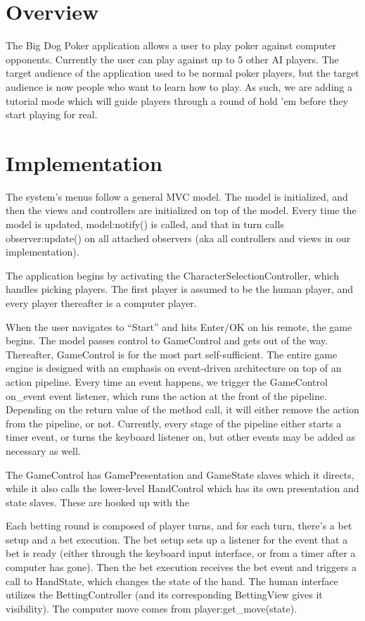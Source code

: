 \documentclass{article}
\begin{document}
\section*{Overview}
The Big Dog Poker application allows a user to play poker against
computer opponents. Currently the user can play against up to 5 other
AI players. The target audience of the application used to be normal
poker players, but the target audience is now people who want to learn
how to play. As such, we are adding a tutorial mode which will guide
players through a round of hold 'em before they start playing for
real.

\section*{Implementation}
The system's menus follow a general MVC model. The model is
initialized, and then the views and controllers are initialized on top
of the model. Every time the model is updated, model:notify() is
called, and that in turn calls observer:update() on all attached
observers (aka all controllers and views in our implementation).

The application begins by activating the CharacterSelectionController,
which handles picking players. The first player is assumed to be the
human player, and every player thereafter is a computer player.

When the user navigates to ``Start'' and hits Enter/OK on his remote,
the game begins. The model passes control to GameControl and gets out
of the way. Thereafter, GameControl is for the most part
self-sufficient. The entire game engine is designed with an emphasis
on event-driven architecture on top of an action pipeline. Every time
an event happens, we trigger the GameControl on\_event event listener,
which runs the action at the front of the pipeline. Depending on the
return value of the method call, it will either remove the action from
the pipeline, or not. Currently, every stage of the pipeline either
starts a timer event, or turns the keyboard listener on, but other
events may be added as necessary as well.

The GameControl has GamePresentation and GameState slaves which it
directs, while it also calls the lower-level HandControl which has its
own presentation and state slaves. These are hooked up with the 

Each betting round is composed of player turns, and for each turn,
there's a bet setup and a bet execution. The bet setup sets up a
listener for the event that a bet is ready (either through the
keyboard input interface, or from a timer after a computer has
gone). Then the bet execution receives the bet event and triggers a
call to HandState, which changes the state of the hand. The human
interface utilizes the BettingController (and its corresponding
BettingView gives it visibility). The computer move comes from
player:get\_move(state).
\end{document}
